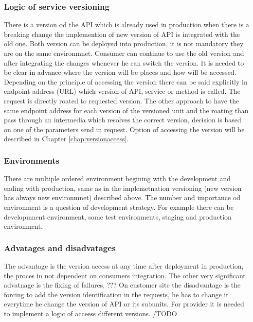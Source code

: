 \subsubsection{Logic of service versioning}
There is a version od the API which is already used in production when there is a breaking change the implemention of new version of API is integrated with the old one. Both version can be deployed into production, it is not mandatory they are on the same environmnet. Consumer can continue to use the old version and after integrating the changes whenever he can switch the version. It is needed to be clear in advance where the version will be places and how will be accessed.
Depending on the principle of accessing the version there can be said explicitly in endpoint address (URL) which version of API, service or method is called. The request is directly roated to requested version. The other approach to have the same endpoint address for each version of the versioned unit and the roating than pass through an intermedia which resolves the correct version, decision is based on one of the parameters send in request. Option of accessing the version will be described in Chapter \ref{chap:versionaccess}.

\subsubsection{Environments}
There are multiple ordered environment begining with the development and ending with production, same as in the implemetnation versioning (new version has always new environmnet) described above. The number and importance od environment is a question of development strategy. For example there can be developmnent environment, some test environments, staging and production environment. 

\subsubsection{Advatages and disadvatages}
The advantage is the version access at any time after deployment in production, the proces in not dependent on consumers integration. The other very significant advatnage is the fixing of failures, ???
On customer site the disadvantage is the forcing to add the version identification in the requests, he has to change it everytime he change the version of API or its subunits. For provider it is needed to implement a logic of acceess different versions.
/TODO




